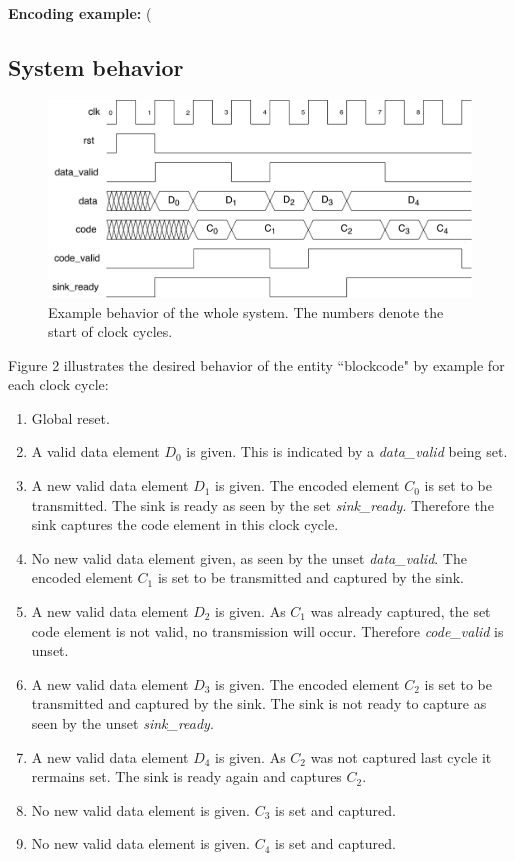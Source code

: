 \documentclass[a4paper,12pt]{article}
\begin{document}
\textbf{Encoding example:} (%

\newpage
\subsection*{\noindent System behavior}

\begin{figure}[h!]
\includegraphics[scale=0.5]{../static/diagram.pdf} 

\caption{Example behavior of the whole system. The numbers denote the start of clock cycles.}
\end{figure}

Figure 2 illustrates the desired behavior of the entity ``blockcode" by example for each clock cycle:
\begin{enumerate}
\item Global reset.
\item A valid data element $D_0$ is given. This is indicated by a \textit{data\_valid} being set.
\item A new valid data element $D_1$ is given. The encoded element $C_0$ is set to be transmitted. The sink is ready as seen by the set \textit{sink\_ready}. Therefore the sink captures the code element in this clock cycle.
\item No new valid data element given, as seen by the unset \textit{data\_valid}. The encoded element $C_1$ is set to be transmitted and captured by the sink.
\item A new valid data element $D_2$ is given. As $C_1$ was already captured, the set code element is not valid, no transmission will occur. Therefore \textit{code\_valid} is unset.
\item A new valid data element $D_3$ is given. The encoded element $C_2$ is set to be transmitted and captured by the sink. The sink is not ready to capture as seen by the unset \textit{sink\_ready}.
\item A new valid data element $D_4$ is given. As $C_2$ was not captured last cycle it rermains set. The sink is ready again and captures $C_2$.
\item No new valid data element is given. $C_3$ is set and captured.
\item No new valid data element is given. $C_4$ is set and captured.
\end{enumerate}
\end{document}
